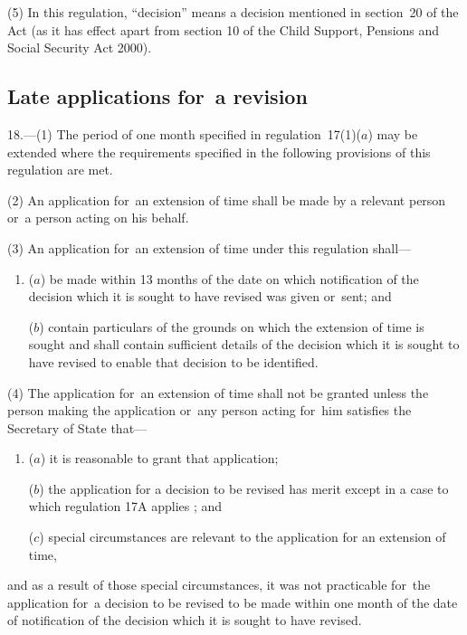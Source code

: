 \documentclass[a4paper,12pt]{article}
\begin{document}
(5) In this regulation, “decision” means a decision mentioned in section~20 of the Act (as it has effect apart from section 10 of the Child Support, Pensions and Social Security Act 2000).


\subsection[18. Late applications for~a revision]{Late applications for~a revision}

18.—(1) The period of one month specified in regulation~17(1)($a$) may be extended where the requirements specified in the following provisions of this regulation are met.

(2) An application for~an extension of time shall be made by a relevant person or~a person acting on his behalf.

(3) An application for~an extension of time under this regulation shall---
\begin{enumerate}\item[]
($a$) be made within 13 months of the date on which notification of the decision which it is sought to have revised was given or~sent; and

($b$) contain particulars of the grounds on which the extension of time is sought and shall contain sufficient details of the decision which it is sought to have revised to enable that decision to be identified.
\end{enumerate}

(4) The application for~an extension of time shall not be granted unless the person making the application or~any person acting for~him satisfies the Secretary of State that---
\begin{enumerate}\item[]
($a$) it is reasonable to grant that application;

($b$) the application for a decision to be revised has merit
except in a case to which regulation 17A applies%
; and

($c$) special circumstances are relevant to the application for an extension of time,
\end{enumerate}
and as a result of those special circumstances, it was not practicable for~the application for~a decision to be revised to be made within one month of the date of notification of the decision which it is sought to have revised.
\end{document}
